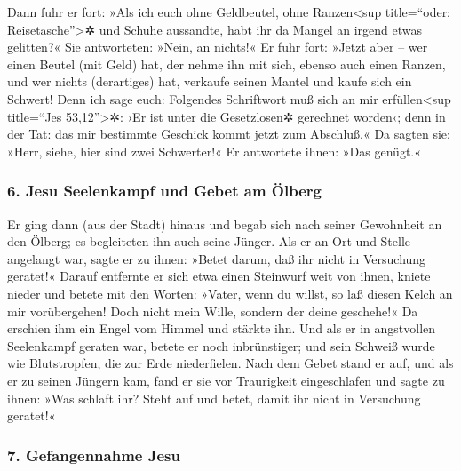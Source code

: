  Dann fuhr er fort: »Als ich euch ohne Geldbeutel, ohne
Ranzen\textless sup title=``oder: Reisetasche''\textgreater✲ und Schuhe
aussandte, habt ihr da Mangel an irgend etwas gelitten?« Sie
antworteten: »Nein, an nichts!«  Er fuhr fort: »Jetzt
aber -- wer einen Beutel (mit Geld) hat, der nehme ihn mit sich, ebenso
auch einen Ranzen, und wer nichts (derartiges) hat, verkaufe seinen
Mantel und kaufe sich ein Schwert!  Denn ich sage euch:
Folgendes Schriftwort muß sich an mir erfüllen\textless sup title=``Jes
53,12''\textgreater✲: ›Er ist unter die Gesetzlosen✲ gerechnet worden‹;
denn in der Tat: das mir bestimmte Geschick kommt jetzt zum Abschluß.«
 Da sagten sie: »Herr, siehe, hier sind zwei Schwerter!«
Er antwortete ihnen: »Das genügt.«

\hypertarget{jesu-seelenkampf-und-gebet-am-uxf6lberg}{%
\subsubsection{6. Jesu Seelenkampf und Gebet am
Ölberg}\label{jesu-seelenkampf-und-gebet-am-uxf6lberg}}

 Er ging dann (aus der Stadt) hinaus und begab sich nach
seiner Gewohnheit an den Ölberg; es begleiteten ihn auch seine Jünger.
 Als er an Ort und Stelle angelangt war, sagte er zu
ihnen: »Betet darum, daß ihr nicht in Versuchung geratet!«
 Darauf entfernte er sich etwa einen Steinwurf weit von
ihnen, kniete nieder und betete  mit den Worten: »Vater,
wenn du willst, so laß diesen Kelch an mir vorübergehen! Doch nicht mein
Wille, sondern der deine geschehe!«  Da erschien ihm ein
Engel vom Himmel und stärkte ihn.  Und als er in
angstvollen Seelenkampf geraten war, betete er noch inbrünstiger; und
sein Schweiß wurde wie Blutstropfen, die zur Erde niederfielen.
 Nach dem Gebet stand er auf, und als er zu seinen
Jüngern kam, fand er sie vor Traurigkeit eingeschlafen 
und sagte zu ihnen: »Was schlaft ihr? Steht auf und betet, damit ihr
nicht in Versuchung geratet!«

\hypertarget{gefangennahme-jesu}{%
\subsubsection{7. Gefangennahme Jesu}\label{gefangennahme-jesu}}

